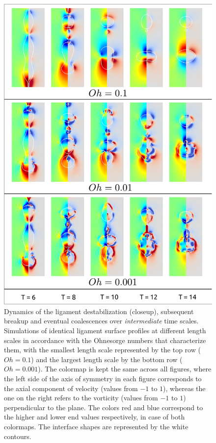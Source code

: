 \begin{figure}
\centering
\includegraphics{plots/ligament_breakup/ohnesorge_compare.pdf}
	\caption{Dynamics of the ligament destabilization (closeup), subsequent breakup 
	and eventual coalescences over \textit{intermediate} time scales.
	Simulations of identical ligament surface profiles
	at different length scales in accordance with the  
	Ohnesorge numbers that characterize them, with the smallest 
	length scale represented by the top row ($Oh = 0.1$) and the largest 
	length scale by the bottom row ($Oh = 0.001$). 
	The colormap is kept the same across all figures, where the left 
	side of the axis of symmetry in each figure corresponds to the axial component of 
	velocity (values from $-1$ to $1$), whereas the one on the right refers to 
	the vorticity (values from $-1$ to $1$) perpendicular to the plane. 
	The colors red and blue correspond to the higher and lower 
	end values respectively, in case of both colormaps. 
	The interface shapes are represented by the white contours.
	}
\label{ohne_comp}
\end{figure}


